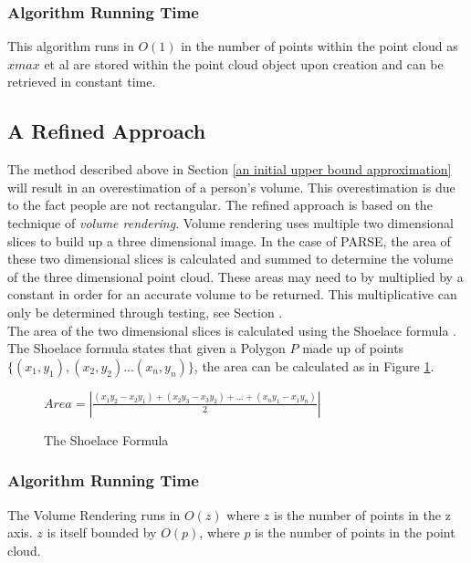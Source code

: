 \subsubsection{Algorithm Running Time}
This algorithm runs in $O(1)$ in the number of points within the point cloud as $xmax$ et al are stored within the point cloud object upon creation and can be retrieved in constant time. 

\subsection{A Refined Approach}
The method described above in Section \ref{an initial upper bound approximation} will result in an overestimation of a person's volume. This overestimation is due to the fact people are not rectangular. The refined approach is based on the technique of \textit{volume rendering}. Volume rendering uses multiple two dimensional slices to build up a three dimensional image. In the case of PARSE, the area of these two dimensional slices is calculated and summed to determine the volume of the three dimensional point cloud. These areas may need to by multiplied by a constant in order for an accurate volume to be returned. This multiplicative can only be determined through testing, see Section .\\

The area of the two dimensional slices is calculated using the Shoelace formula \cite{Pretzsch2009}. The Shoelace formula states that given a Polygon $P$ made up of points $\{(x_1,y_1),(x_2,y_2)...(x_n,y_n)\}$, the area can be calculated as in Figure \ref{fig:the shoelace formula}.

\begin{figure}[h]
\begin{center}
$Area = \left|\frac{(x_1y_2 - x_2y_1) + (x_2y_3 - x_3y_2) + ... + (x_ny_1 - x_1y_n)}{2}\right|$
\end{center}
\caption{The Shoelace Formula \cite{Pretzsch2009}}
\label{fig:the shoelace formula}
\end{figure}


\subsubsection{Algorithm Running Time}
The Volume Rendering runs in $O(z)$ where $z$ is the number of points in the z axis. $z$ is itself bounded by $O(p)$, where $p$ is the number of points in the point cloud. \\

